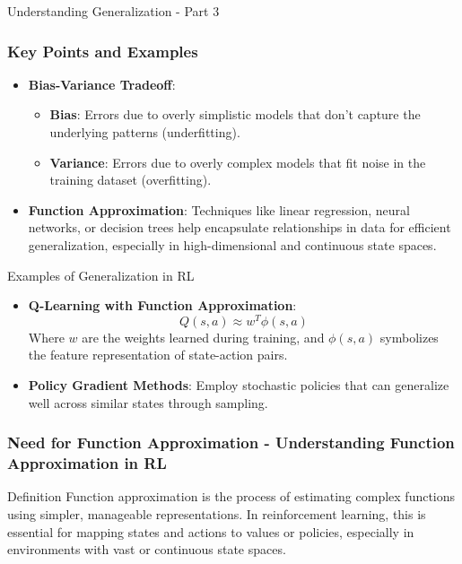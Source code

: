 \documentclass[aspectratio=169]{beamer}
\begin{document}
\begin{frame}[fragile]{Understanding Generalization - Part 3}
    \frametitle{Key Points and Examples}
    \begin{itemize}
        \item \textbf{Bias-Variance Tradeoff}:
            \begin{itemize}
                \item \textbf{Bias}: Errors due to overly simplistic models that don’t capture the underlying patterns (underfitting).
                \item \textbf{Variance}: Errors due to overly complex models that fit noise in the training dataset (overfitting).
            \end{itemize}
        \item \textbf{Function Approximation}: Techniques like linear regression, neural networks, or decision trees help encapsulate relationships in data for efficient generalization, especially in high-dimensional and continuous state spaces.
    \end{itemize}
    
    \begin{block}{Examples of Generalization in RL}
        \begin{itemize}
            \item \textbf{Q-Learning with Function Approximation}: 
                \begin{equation}
                    Q(s, a) \approx w^T \phi(s, a)
                \end{equation}
                Where \(w\) are the weights learned during training, and \(\phi(s, a)\) symbolizes the feature representation of state-action pairs.
            \item \textbf{Policy Gradient Methods}: Employ stochastic policies that can generalize well across similar states through sampling.
        \end{itemize}
    \end{block}
\end{frame}

\begin{frame}[fragile]
    \frametitle{Need for Function Approximation - Understanding Function Approximation in RL}
    \begin{block}{Definition}
        Function approximation is the process of estimating complex functions using simpler, manageable representations. In reinforcement learning, this is essential for mapping states and actions to values or policies, especially in environments with vast or continuous state spaces.
    \end{block}
\end{frame}
\end{document}
